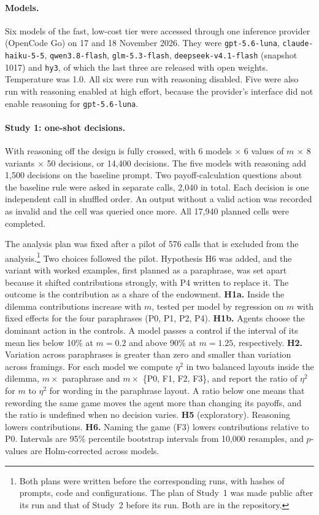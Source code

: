 \documentclass[runningheads]{llncs}
\begin{document}
\paragraph{Models.} {\sloppy Six models of the fast, low-cost tier were accessed through one inference provider (OpenCode Go) on 17 and 18 November 2026. They were \texttt{gpt-5.6-luna}, \texttt{claude-haiku-5-5}, \texttt{qwen3.8-flash}, \texttt{glm-5.3-flash}, \texttt{deepseek-v4.1-flash} (snapshot 1017) and \texttt{hy3}, of which the last three are released with open weights. Temperature was 1.0. All six were run with reasoning disabled. Five were also run with reasoning enabled at high effort, because the provider's interface did not enable reasoning for \texttt{gpt-5.6-luna}.\par}

\paragraph{Study 1: one-shot decisions.} With reasoning off the design is fully crossed, with 6 models $\times$ 6 values of $m$ $\times$ 8 variants $\times$ 50 decisions, or 14,400 decisions. The five models with reasoning add 1,500 decisions on the baseline prompt. Two payoff-calculation questions about the baseline rule were asked in separate calls, 2,040 in total. Each decision is one independent call in shuffled order. An output without a valid action was recorded as invalid and the cell was queried once more. All 17,940 planned cells were completed.

The analysis plan was fixed after a pilot of 576 calls that is excluded from the analysis.\footnote{Both plans were written before the corresponding runs, with hashes of prompts, code and configurations. The plan of Study~1 was made public after its run and that of Study~2 before its run. Both are in the repository.} Two choices followed the pilot. Hypothesis H6 was added, and the variant with worked examples, first planned as a paraphrase, was set apart because it shifted contributions strongly, with P4 written to replace it. The outcome is the contribution as a share of the endowment. \textbf{H1a.} Inside the dilemma contributions increase with $m$, tested per model by regression on $m$ with fixed effects for the four paraphrases (P0, P1, P2, P4). \textbf{H1b.} Agents choose the dominant action in the controls. A model passes a control if the interval of its mean lies below 10\% at $m=0.2$ and above 90\% at $m=1.25$, respectively. \textbf{H2.} Variation across paraphrases is greater than zero and smaller than variation across framings. For each model we compute $\eta^2$ in two balanced layouts inside the dilemma, $m \times$ paraphrase and $m \times$ \{P0, F1, F2, F3\}, and report the ratio of $\eta^2$ for $m$ to $\eta^2$ for wording in the paraphrase layout. A ratio below one means that rewording the same game moves the agent more than changing its payoffs, and the ratio is undefined when no decision varies. \textbf{H5} (exploratory). Reasoning lowers contributions. \textbf{H6.} Naming the game (F3) lowers contributions relative to P0. Intervals are 95\% percentile bootstrap intervals from 10,000 resamples, and $p$-values are Holm-corrected across models.
\end{document}
